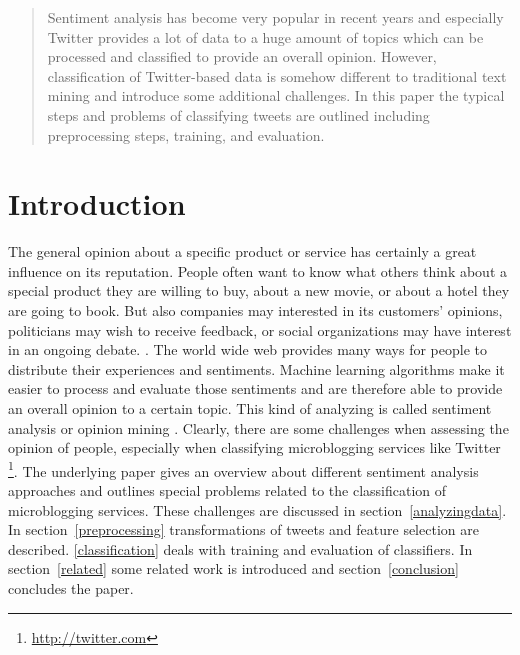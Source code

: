 \documentclass{acm_proc_article-sp}
\begin{document}

\maketitle
\begin{abstract}
Sentiment analysis has become very popular in recent years and especially
Twitter provides a lot of data to a huge amount of topics which can be
processed and classified to provide an overall opinion. However, classification
of Twitter-based data is somehow different to traditional text mining and
introduce some additional challenges. In this paper the typical steps and problems of classifying tweets are outlined including preprocessing steps, training, and evaluation.
\end{abstract}





\section{Introduction} The general opinion about a specific product or service
has certainly a great influence on its reputation. People often want to know
what others think about a special product they are willing to buy, about a new
movie, or about a hotel they are going to book. But also companies may
interested in its customers' opinions, politicians may wish to receive
feedback, or social organizations may have interest in an ongoing debate.
\cite{pak2010twitter}.  The world wide web provides many ways for people to
distribute their experiences and sentiments. Machine learning algorithms make
it easier to process and evaluate those sentiments and are therefore able to
provide an overall opinion to a certain topic. This kind of analyzing is called
sentiment analysis or opinion mining \cite{liu2010sentimentanalysis,
pang2008opinion}. Clearly, there are some challenges when assessing the opinion
of people, especially when classifying microblogging services like Twitter
\footnote{\url{http://twitter.com}}. The underlying paper gives an overview
about different sentiment analysis approaches and outlines special problems
related to the classification of microblogging services. These challenges are
discussed in section~\ref{analyzingdata}. In section~\ref{preprocessing} transformations of tweets and feature selection are described. \ref{classification} deals with training and evaluation of classifiers. In section~\ref{related} some related work is introduced
and section~\ref{conclusion} concludes the paper.
\end{document}
